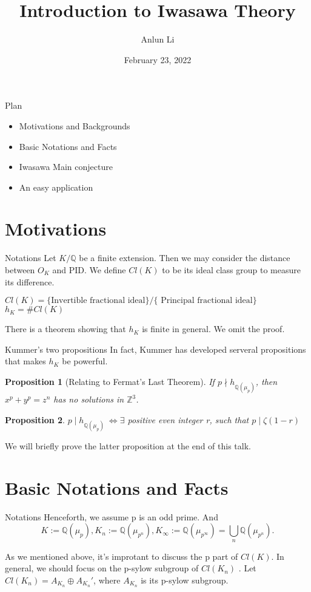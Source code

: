 \documentclass{beamer}
\title{Introduction to Iwasawa Theory}
\author{Anlun Li}
\institute{USTC}
\date{February 23, 2022}
\theoremstyle{plain}
\newtheorem{proposition}{Proposition}[section]
\theoremstyle{definition}
\theoremstyle{remark}
\newcommand{\Q}{\mathbb{Q}}
\newcommand{\Z}{\mathbb{Z}}
\newcommand{\an}{A_{K_n}}
\begin{document}
\begin{frame}
  \titlepage
\end{frame}

\begin{frame}{Plan}
  \begin{itemize}
    \item Motivations and Backgrounds
    \item Basic Notations and Facts
    \item Iwasawa Main conjecture
    \item An easy application
  \end{itemize}
\end{frame}

\section{Motivations}
\begin{frame}{Notations}
  Let $K/\Q$ be a finite extension. Then we may consider the distance between 
  $O_K$ and PID. We define $Cl(K)$ to be its ideal class group to measure its difference.
  \begin{definition}
    $Cl(K)=\{ \text{Invertible fractional ideal}\}/
     \{\text{ Principal fractional ideal}\}$
     $h_K= \#Cl(K)$
  \end{definition}
  There is a theorem showing that $h_K$ is finite in general. We omit the proof.
\end{frame}


\begin{frame}{Kummer's two propositions}
  In fact, Kummer has developed serveral propositions that makes $h_K$ be powerful.
  \begin{proposition}[Relating to Fermat's Last Theorem]
    If $p \nmid h_{\Q(\mu_p)}$, then $x^p+y^p=z^n$ has no solutions in $\Z^3$.
  \end{proposition}
  \begin{proposition}
    $p \mid h_{\Q(\mu_p)} \ \iff \exists$ positive even integer r, such that 
    $p \mid \zeta(1-r)$
  \end{proposition}
  We will briefly prove the latter proposition at the end of this talk.
\end{frame}

\section{Basic Notations and Facts}
\begin{frame}{Notations}
  Henceforth, we assume p is an odd prime. And \[K:=\Q(\mu_p), K_n:=\Q(\mu_{p^n})
  ,K_{\infty}:=\Q(\mu_{p^{\infty}})=\bigcup_n \Q(\mu_{p^n}).\]
 
  As we mentioned above, it's improtant to discuss the p part of $Cl(K)$.
  In general, we should focus on the p-sylow subgroup of $Cl(K_n)$ .
\vskip 0.2cm
  Let $Cl(K_n)=\an \oplus \an'$, where $\an$ is its p-sylow subgroup.
\end{frame}
\end{document}
